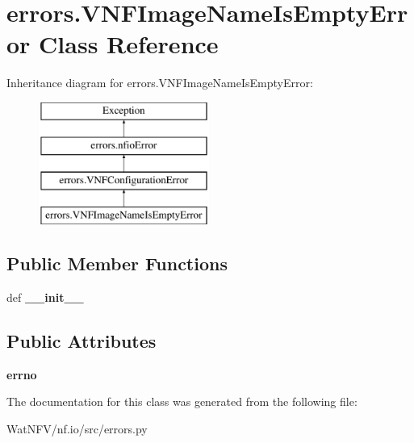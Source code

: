 \hypertarget{classerrors_1_1VNFImageNameIsEmptyError}{\section{errors.\-V\-N\-F\-Image\-Name\-Is\-Empty\-Error Class Reference}
\label{classerrors_1_1VNFImageNameIsEmptyError}
}
Inheritance diagram for errors.\-V\-N\-F\-Image\-Name\-Is\-Empty\-Error\-:\begin{figure}[H]
\begin{center}
\leavevmode
\includegraphics[height=4.000000cm]{classerrors_1_1VNFImageNameIsEmptyError}
\end{center}
\end{figure}
\subsection*{Public Member Functions}
\begin{DoxyCompactItemize}
\item 
\hypertarget{classerrors_1_1VNFImageNameIsEmptyError_a58a6d457d974dd896fa1d9f3db0392ed}{def {\bfseries \-\_\-\-\_\-init\-\_\-\-\_\-}}\label{classerrors_1_1VNFImageNameIsEmptyError_a58a6d457d974dd896fa1d9f3db0392ed}

\end{DoxyCompactItemize}
\subsection*{Public Attributes}
\begin{DoxyCompactItemize}
\item 
\hypertarget{classerrors_1_1VNFImageNameIsEmptyError_a51eb42467bf171acfba9c993e378580b}{{\bfseries errno}}\label{classerrors_1_1VNFImageNameIsEmptyError_a51eb42467bf171acfba9c993e378580b}

\end{DoxyCompactItemize}


The documentation for this class was generated from the following file\-:\begin{DoxyCompactItemize}
\item 
Wat\-N\-F\-V/nf.\-io/src/errors.\-py\end{DoxyCompactItemize}
